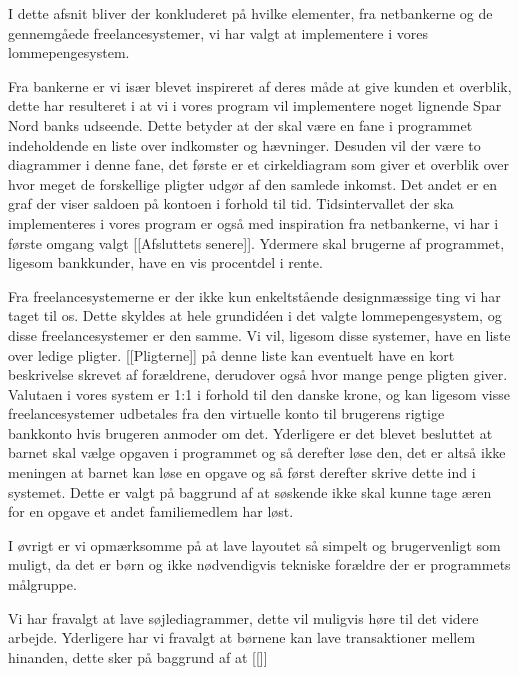 I dette afsnit bliver der konkluderet på hvilke elementer, fra netbankerne og de gennemgåede freelancesystemer, vi har valgt at implementere i vores lommepengesystem.

Fra bankerne er vi især blevet inspireret af deres måde at give kunden et overblik, dette har resulteret i at vi i vores program vil implementere noget lignende Spar Nord banks udseende. Dette betyder at der skal være en fane i programmet indeholdende en liste over indkomster og hævninger. Desuden vil der være to diagrammer i denne fane, det første er et cirkeldiagram som giver et overblik over hvor meget de forskellige pligter udgør af den samlede inkomst. Det andet er en graf der viser saldoen på kontoen i forhold til tid. Tidsintervallet der ska implementeres i vores program er også med inspiration fra netbankerne, vi har i første omgang valgt [[Afsluttets senere]]. Ydermere skal brugerne af programmet, ligesom bankkunder, have en vis procentdel i rente.

Fra freelancesystemerne er der ikke kun enkeltstående designmæssige ting vi har taget til os. Dette skyldes at hele grundidéen i det  valgte lommepengesystem, og disse freelancesystemer er den samme. Vi  vil, ligesom disse systemer, have en liste over ledige pligter. [[Pligterne]] på denne liste kan eventuelt have en kort beskrivelse skrevet af forældrene, derudover også hvor mange penge pligten giver. Valutaen i vores system er 1:1 i forhold til den danske krone, og kan ligesom visse freelancesystemer udbetales fra den virtuelle konto til brugerens rigtige bankkonto hvis brugeren anmoder om det. Yderligere er det blevet besluttet at barnet skal vælge opgaven i programmet og så derefter løse den, det er altså ikke meningen at barnet kan løse en opgave og så først derefter skrive dette ind i systemet. Dette er valgt på baggrund af at søskende ikke skal kunne tage æren for en opgave et andet familiemedlem har løst.

I øvrigt er vi opmærksomme på at lave layoutet så simpelt og brugervenligt som muligt, da det er børn og ikke nødvendigvis tekniske forældre der er programmets målgruppe. 

Vi har fravalgt at lave søjlediagrammer, dette vil muligvis høre til det videre arbejde. Yderligere har vi fravalgt at børnene kan lave transaktioner mellem hinanden, dette sker på baggrund af at [[]]




